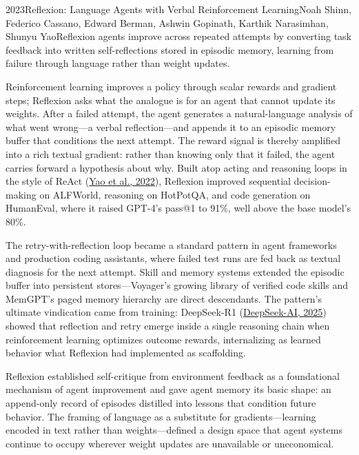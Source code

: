
\begin{papersummary}{2023}{Reflexion: Language Agents with Verbal Reinforcement Learning}{Noah Shinn, Federico Cassano, Edward Berman, Ashwin Gopinath, Karthik Narasimhan, Shunyu Yao}{Reflexion agents improve across repeated attempts by converting task feedback into written self-reflections stored in episodic memory, learning from failure through language rather than weight updates.}

Reinforcement learning improves a policy through scalar rewards and gradient steps; Reflexion asks what the analogue is for an agent that cannot update its weights. After a failed attempt, the agent generates a natural-language analysis of what went wrong---a verbal reflection---and appends it to an episodic memory buffer that conditions the next attempt. The reward signal is thereby amplified into a rich textual gradient: rather than knowing only that it failed, the agent carries forward a hypothesis about why. Built atop acting and reasoning loops in the style of ReAct (\hyperref[paper:yao-2022]{Yao et al., 2022}), Reflexion improved sequential decision-making on ALFWorld, reasoning on HotPotQA, and code generation on HumanEval, where it raised GPT-4's pass@1 to 91\%, well above the base model's 80\%.

The retry-with-reflection loop became a standard pattern in agent frameworks and production coding assistants, where failed test runs are fed back as textual diagnosis for the next attempt. Skill and memory systems extended the episodic buffer into persistent stores---Voyager's growing library of verified code skills and MemGPT's paged memory hierarchy are direct descendants. The pattern's ultimate vindication came from training: DeepSeek-R1 (\hyperref[paper:deepseek-2025-r1]{DeepSeek-AI, 2025}) showed that reflection and retry emerge inside a single reasoning chain when reinforcement learning optimizes outcome rewards, internalizing as learned behavior what Reflexion had implemented as scaffolding.

Reflexion established self-critique from environment feedback as a foundational mechanism of agent improvement and gave agent memory its basic shape: an append-only record of episodes distilled into lessons that condition future behavior. The framing of language as a substitute for gradients---learning encoded in text rather than weights---defined a design space that agent systems continue to occupy wherever weight updates are unavailable or uneconomical.

\end{papersummary}
